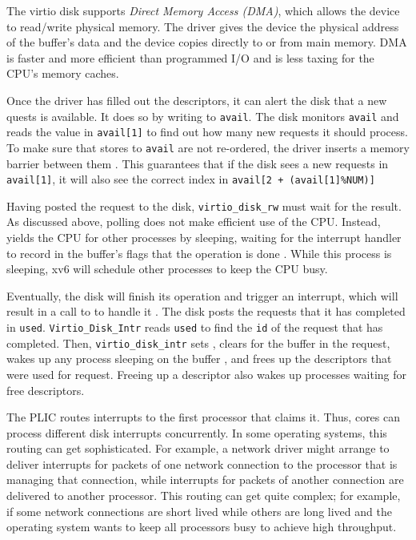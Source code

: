 The virtio disk supports \textit{Direct Memory Access
  (DMA)}, which allows the device to read/write physical
memory.  The driver gives the device the physical address of the
buffer's data  and the device
copies directly to or from main memory.  DMA is faster and more
efficient than programmed I/O and is less taxing for the CPU's memory
caches.

Once the driver has filled out the descriptors, it can alert the disk
that a new quests is available.  It does so by writing to
\lstinline{avail}.  The disk monitors \lstinline{avail} and reads the
value in \lstinline{avail[1]} to find out how many new requests it
should process.  To make sure that stores to \lstinline{avail} are not
re-ordered, the driver inserts a memory barrier between them
. This guarantees
that if the disk sees a new requests in \lstinline{avail[1]}, it will
also see the correct index in \lstinline{avail[2 + (avail[1]%NUM)]}

Having posted the request to the disk,
\lstinline{virtio_disk_rw}
must wait for the result.  As discussed above,
polling does not make efficient use of the CPU.
Instead,
yields the CPU for other processes by sleeping,
waiting for the interrupt handler to 
record in the buffer's flags that the operation is done
.
While this process is sleeping,
xv6 will schedule other processes to keep the CPU busy.

Eventually, the disk will finish its operation and trigger an
interrupt, which will result in a call to
to handle it
.
The disk posts the requests that it has completed in \lstinline{used}.
\lstinline{Virtio_Disk_Intr}
reads \lstinline{used} to find the \lstinline{id} of
the request that has completed.
Then, \lstinline{virtio_disk_intr}
sets 
,
clears
 for the buffer in the request,
wakes up any process sleeping on the buffer
,
and frees up the descriptors that were used for request.
Freeing up a descriptor also wakes up processes
waiting for free descriptors.

The PLIC routes interrupts to the first processor that claims it.
Thus, cores can process different disk interrupts concurrently.  In
some operating systems, this routing can get sophisticated.  For
example, a network driver might arrange to deliver interrupts for
packets of one network connection to the processor that is managing
that connection, while interrupts for packets of another connection
are delivered to another processor.  This routing can get quite
complex; for example, if some network connections are short lived
while others are long lived and the operating system wants to keep all
processors busy to achieve high throughput.

